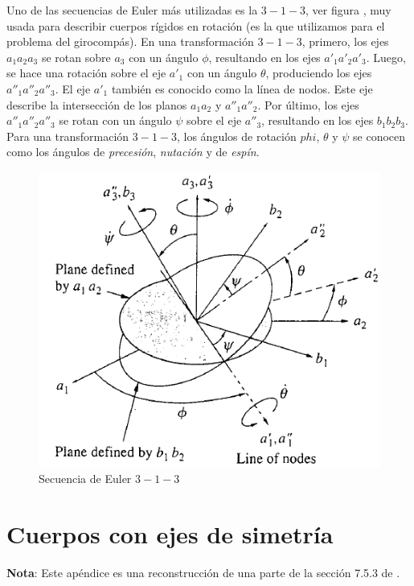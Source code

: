 \documentclass[a4paper,10pt]{article}
\numberwithin{equation}{section}
\begin{document}
Uno de las secuencias de Euler más utilizadas es la $3-1-3$, ver figura , muy usada para describir 
cuerpos rígidos en rotación (es la que utilizamos para el problema del girocompás). En 
una transformación $3-1-3$, primero, los ejes $a_1a_2a_3$ se rotan sobre $a_3$ 
con un ángulo $\phi$, resultando en los ejes $a'_1a'_2a'_3$. Luego, se hace una rotación 
sobre el eje $a'_1$ con un ángulo $\theta$, produciendo los ejes $a''_1a''_2a''_3$. 
El eje $a'_1$ también es conocido como la línea de nodos. Este eje describe la 
intersección de los planos $a_1a_2$ y $a''_1a''_2$. Por último, los ejes $a''_1a''_2a''_3$ 
se rotan con un ángulo $\psi$ sobre el eje $a''_3$, resultando en los ejes $b_1b_2b_3$.
Para una transformación $3-1-3$, los ángulos de rotación $phi$, $\theta$ y $\psi$ se 
conocen como los ángulos de \emph{precesión}, \emph{nutación} y de \emph{espín}.


\begin{figure}[H]
\center 
\includegraphics[scale=0.38]{apendice2fig1}
\caption{Secuencia de Euler $3-1-3$}
\label{fig:apendice2fig1}
\end{figure}

\newpage

\section{Cuerpos con ejes de simetría} \label{app:apendice3}

\textbf{Nota}: Este apéndice es una reconstrucción de una parte de la sección 7.5.3 
de \cite{baruh}.
\end{document}
